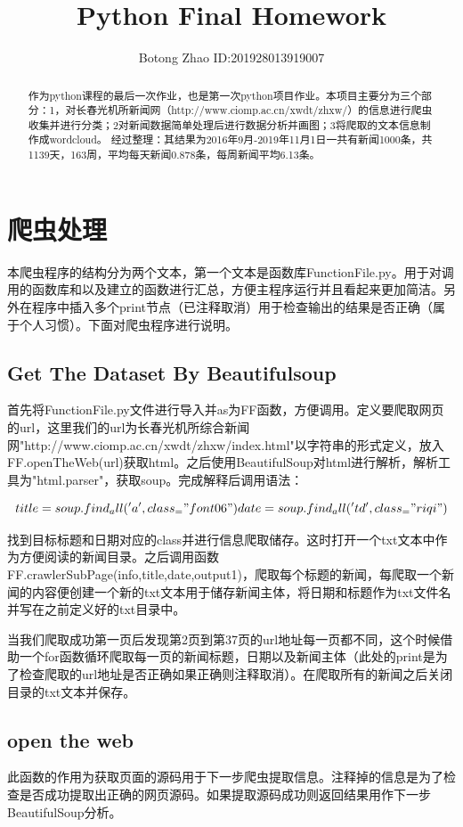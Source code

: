 \documentclass[12pt]{article}
\title{Python Final Homework}
\author{Botong Zhao ID:201928013919007}
\begin{document}
	\maketitle
	\begin{abstract}
		作为python课程的最后一次作业，也是第一次python项目作业。本项目主要分为三个部分：1，对长春光机所新闻网（http://www.ciomp.ac.cn/xwdt/zhxw/）的信息进行爬虫收集并进行分类；2对新闻数据简单处理后进行数据分析并画图；3将爬取的文本信息制作成wordcloud。
		经过整理：其结果为2016年9月-2019年11月1日一共有新闻1000条，共1139天，163周，平均每天新闻0.878条，每周新闻平均6.13条。
	\end{abstract}
	\section{爬虫处理}
	本爬虫程序的结构分为两个文本，第一个文本是函数库FunctionFile.py。用于对调用的函数库和以及建立的函数进行汇总，方便主程序运行并且看起来更加简洁。另外在程序中插入多个print节点（已注释取消）用于检查输出的结果是否正确（属于个人习惯）。下面对爬虫程序进行说明。
	\subsection{Get The Dataset By Beautifulsoup}
	首先将FunctionFile.py文件进行导入并as为FF函数，方便调用。定义要爬取网页的url，这里我们的url为长春光机所综合新闻网"http://www.ciomp.ac.cn/xwdt/zhxw/index.html"以字符串的形式定义，放入FF.openTheWeb(url)获取html。之后使用BeautifulSoup对html进行解析，解析工具为"html.parser"，获取soup。完成解释后调用语法：
	
	$$
	title=soup.find_all('a',class_="font06")
	date=soup.find_all('td',class_= "riqi")
	$$
	
	找到目标标题和日期对应的class并进行信息爬取储存。这时打开一个txt文本中作为方便阅读的新闻目录。之后调用函数FF.crawlerSubPage(info,title,date,output1)，爬取每个标题的新闻，每爬取一个新闻的内容便创建一个新的txt文本用于储存新闻主体，将日期和标题作为txt文件名并写在之前定义好的txt目录中。
	
	当我们爬取成功第一页后发现第2页到第37页的url地址每一页都不同，这个时候借助一个for函数循环爬取每一页的新闻标题，日期以及新闻主体（此处的print是为了检查爬取的url地址是否正确如果正确则注释取消）。在爬取所有的新闻之后关闭目录的txt文本并保存。
	\subsection{open the web}
	此函数的作用为获取页面的源码用于下一步爬虫提取信息。注释掉的信息是为了检查是否成功提取出正确的网页源码。如果提取源码成功则返回结果用作下一步BeautifulSoup分析。
	
\end{document}
